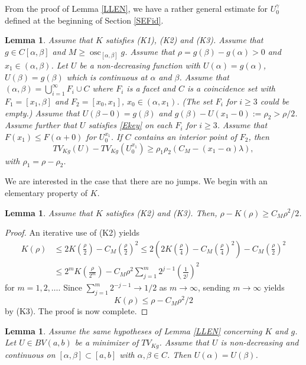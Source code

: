\documentclass[11pt]{amsart} %
\numberwithin{equation}{section}
\newtheorem{lem}[thm]{Lemma}
\begin{document}
From the proof of Lemma \ref{LLEN}, we have a rather general estimate for $U_0^\gamma$ defined at the beginning of Section \ref{SEFid}.
\begin{lem} \label{LGEs}
Assume that $K$ satisfies (K1), (K2) and (K3).
 Assume that $g\in C[\alpha,\beta]$ and $M\geq\operatorname{osc}_{[\alpha,\beta]}g$.
 Assume that $\rho=g(\beta)-g(\alpha)>0$ and $x_1\in(\alpha,\beta)$.
 Let $U$ be a non-decreasing function with $U(\alpha)=g(\alpha)$, $U(\beta)=g(\beta)$ which is continuous at $\alpha$ and $\beta$.
 Assume that $(\alpha,\beta)=\bigcup_{i=1}^\infty F_i\cup C$ where $F_i$ is a facet and $C$ is a coincidence set with $F_1=[x_1,\beta]$ and $F_2=[x_0,x_1]$, $x_0\in(\alpha,x_1)$.
 (The set $F_i$ for $i\geq 3$ could be empty.)
 Assume that $U(\beta-0)=g(\beta)$ and $g(\beta)-U(x_1-0):=\rho_2>\rho/2$.
 Assume further that $U$ satisfies \eqref{Ekey} on each $F_i$ for $i\geq3$.
 Assume that $F(x_1)\leq F(\alpha+0)$ for $U_0^{x_1}$. 
 If $C$ contains an interior point of $F_2$, then
\[
	TV_{Kg}(U) - TV_{Kg}(U_0^{x_1})
	\geq  \rho_1 \rho_2 \left( C_M - (x_1 - \alpha)\lambda \right),
\]
with $\rho_1=\rho-\rho_2$.
\end{lem}
We are interested in the case that there are no jumps.
 We begin with an elementary property of $K$.
\begin{lem} \label{LEeK}
Assume that $K$ satisfies (K2) and (K3).
 Then, $\rho-K(\rho)\geq C_M\rho^2/2$.
\end{lem}
\begin{proof}
An iterative use of (K2) yields
\begin{align*}
	K(\rho) &\leq 2K \left(\frac\rho2\right) - C_M\left(\frac\rho2\right)^2
	\leq 2 \left( 2K \left(\frac\rho4\right) - C_M\left(\frac\rho4\right)^2 \right) - C_M\left(\frac\rho2\right)^2 \\
	&\leq 2^m K \left(\frac{\rho}{2^m}\right) - C_M \rho^2 \sum_{j=1}^m 2^{j-1}\left(\frac{1}{2^j}\right)^2
\end{align*}
for $m=1,2,\ldots$.
 Since $\sum_{j=1}^m 2^{-j-1}\to1/2$ as $m\to\infty$, sending $m\to\infty$ yields
\[
	K(\rho) \leq \rho - C_M\rho^2/2
\]
by (K3).
 The proof is now complete.
\end{proof}
% 
\begin{lem} \label{LCont}
Assume the same hypotheses of Lemma \ref{LLEN} concerning $K$ and $g$.
 Let $U\in BV(a,b)$ be a minimizer of $TV_{Kg}$.
 Assume that $U$ is non-decreasing and continuous on $[\alpha,\beta]\subset[a,b]$ with $\alpha,\beta\in C$.
 Then $U(\alpha)=U(\beta)$.
\end{lem}
\end{document}
